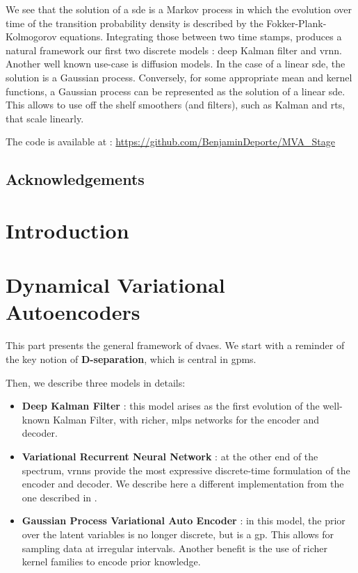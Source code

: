 \documentclass[twoside,11pt]{report}
\begin{document}
We see that the solution of a \gls{sde} is a Markov process in which the evolution over time of the transition probability density is described by the Fokker-Plank-Kolmogorov equations. Integrating those between two
time stamps, produces a natural framework our first two discrete models : deep Kalman filter and \gls{vrnn}. Another well known 
use-case is diffusion models. In the case of a linear \gls{sde}, the solution is a Gaussian process. Conversely, for some appropriate mean and kernel functions, 
a Gaussian process can be represented as the solution of a linear \gls{sde}. This allows to use off the shelf smoothers (and filters), such as Kalman and \gls{rts}, that scale linearly.

The code is available at : \url{https://github.com/BenjaminDeporte/MVA_Stage}

\chapter*{Acknowledgements}



\newpage
\singlespacing
\tableofcontents

\newpage
\listoffigures

\part{Introduction}
    
    
    
    

%
%
%
%
\part{Dynamical Variational Autoencoders}

This part presents the general framework of \glspl{dvae}. We start with a reminder of the key notion of \textbf{D-separation}, which is central in \glspl{gpm}.

Then, we describe three models in details:
\begin{itemize}
    \item \textbf{Deep Kalman Filter} : this model arises as the first evolution of the well-known Kalman Filter, with richer, \glspl{mlp} networks for the encoder and decoder.
    \item \textbf{Variational Recurrent Neural Network} : at the other end of the spectrum, \glspl{vrnn} provide the most expressive discrete-time formulation of the encoder and decoder.
We describe here a different implementation from the one described in \cite{girin_dynamical_2022}.
    \item \textbf{Gaussian Process Variational Auto Encoder} : in this model, the prior over the latent variables is no longer discrete, but is a \gls{gp}.
This allows for sampling data at irregular intervals. Another benefit is the use of richer kernel families to encode prior knowledge.
\end{itemize}
\end{document}
